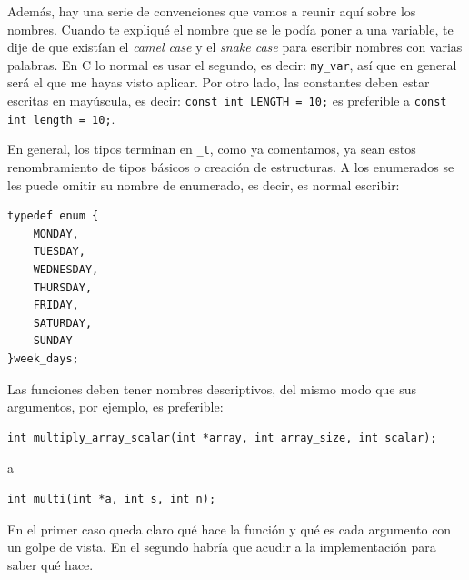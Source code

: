\documentclass[a4paper]{article}
\begin{document}
Además, hay una serie de convenciones que vamos a reunir aquí sobre los nombres.
Cuando te expliqué el nombre que se le podía poner a una variable, te dije de
que existían el \textit{camel case} y el \textit{snake case} para escribir
nombres con varias palabras. En C lo normal es usar el segundo, es decir:
\verb!my_var!, así que en general será el que me hayas visto aplicar. Por otro
lado, las constantes deben estar escritas en mayúscula, es decir:
\lstinline[style=C]!const int LENGTH = 10;! es preferible a
\lstinline[style=C]!const int length = 10;!.

En general, los tipos terminan en \verb!_t!, como ya comentamos, ya sean estos
renombramiento de tipos básicos o creación de estructuras. A los enumerados
se les puede omitir su nombre de enumerado, es decir, es normal escribir:

\noindent
\begin{minipage}[H]{\linewidth}
\mbox{}
\begin{lstlisting}[style=C,
caption={Ejemplo de tipo enumerado con typedef},
label={lst:typedefEnum}]
typedef enum {
    MONDAY,
    TUESDAY,
    WEDNESDAY,
    THURSDAY,
    FRIDAY,
    SATURDAY,
    SUNDAY
}week_days;
\end{lstlisting}
\end{minipage}

Las funciones deben tener nombres descriptivos, del mismo modo que sus argumentos,
por ejemplo, es preferible:

\noindent
\begin{minipage}[H]{\linewidth}
\mbox{}
\begin{lstlisting}[style=C,
caption={Ejemplo de función descriptiva},
label={lst:descriptiveFunction}]
int multiply_array_scalar(int *array, int array_size, int scalar);
\end{lstlisting}
\end{minipage}

a

\noindent
\begin{minipage}[H]{\linewidth}
\mbox{}
\begin{lstlisting}[style=C,
caption={Ejemplo de función no descriptiva},
label={lst:nonDescriptiveFunction}]
int multi(int *a, int s, int n);
\end{lstlisting}
\end{minipage}

En el primer caso queda claro qué hace la función y qué es cada argumento
con un golpe de vista. En el segundo habría que acudir a la implementación
para saber qué hace.
\end{document}
